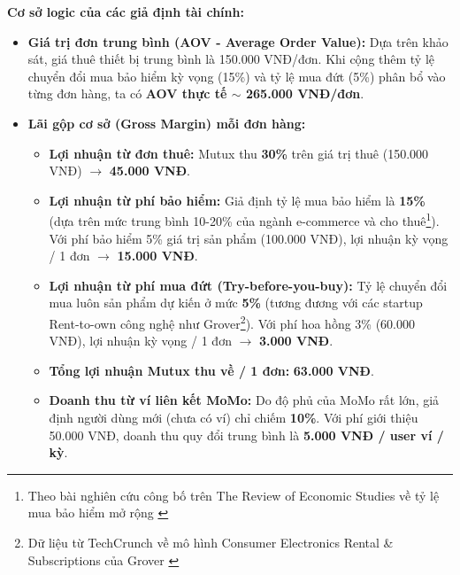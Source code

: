 \textbf{Cơ sở logic của các giả định tài chính:}
\begin{itemize}
    \item \textbf{Giá trị đơn trung bình (AOV - Average Order Value):} Dựa trên khảo sát, giá thuê thiết bị trung bình là 150.000 VNĐ/đơn. Khi cộng thêm tỷ lệ chuyển đổi mua bảo hiểm kỳ vọng (15\%) và tỷ lệ mua đứt (5\%) phân bổ vào từng đơn hàng, ta có \textbf{AOV thực tế $\sim$ 265.000 VNĐ/đơn}.
    \item \textbf{Lãi gộp cơ sở (Gross Margin) mỗi đơn hàng:}
    \begin{itemize}
        \item \textbf{Lợi nhuận từ đơn thuê:} Mutux thu \textbf{30\%} trên giá trị thuê (150.000 VNĐ) $\rightarrow$ \textbf{45.000 VNĐ}.
        \item \textbf{Lợi nhuận từ phí bảo hiểm:} Giả định tỷ lệ mua bảo hiểm là \textbf{15\%} (dựa trên mức trung bình 10-20\% của ngành e-commerce và cho thuê\footnote{Theo bài nghiên cứu công bố trên The Review of Economic Studies về tỷ lệ mua bảo hiểm mở rộng \cite{abito2019warranty}}). Với phí bảo hiểm 5\% giá trị sản phẩm (100.000 VNĐ), lợi nhuận kỳ vọng / 1 đơn $\rightarrow$ \textbf{15.000 VNĐ}.
        \item \textbf{Lợi nhuận từ phí mua đứt (Try-before-you-buy):} Tỷ lệ chuyển đổi mua luôn sản phẩm dự kiến ở mức \textbf{5\%} (tương đương với các startup Rent-to-own công nghệ như Grover\footnote{Dữ liệu từ TechCrunch về mô hình Consumer Electronics Rental \& Subscriptions của Grover \cite{techcrunch2022grover}}). Với phí hoa hồng 3\% (60.000 VNĐ), lợi nhuận kỳ vọng / 1 đơn $\rightarrow$ \textbf{3.000 VNĐ}.
        \item \textbf{Tổng lợi nhuận Mutux thu về / 1 đơn:} \textbf{63.000 VNĐ}.
        \item \textbf{Doanh thu từ ví liên kết MoMo:} Do độ phủ của MoMo rất lớn, giả định người dùng mới (chưa có ví) chỉ chiếm \textbf{10\%}. Với phí giới thiệu 50.000 VNĐ, doanh thu quy đổi trung bình là \textbf{5.000 VNĐ / user ví / kỳ}.
    \end{itemize}
\end{itemize}

